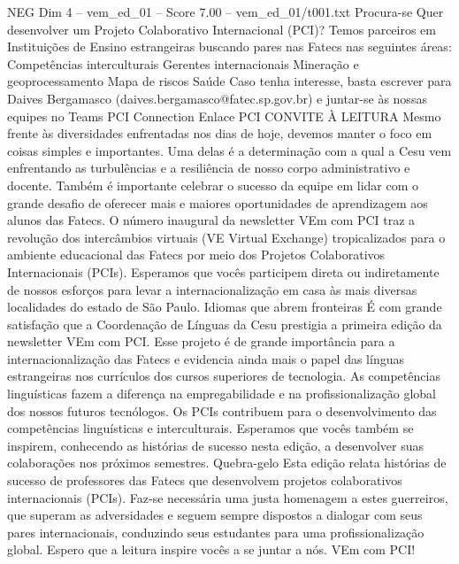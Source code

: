 \begin{textsample}{NEG Dim 4 – vem\_ed\_01 – Score 7.00 – vem\_ed\_01/t001.txt}  \label{ex:f4_neg_155}
Procura-se Quer desenvolver um Projeto Colaborativo Internacional (PCI)?
Temos parceiros em Instituições de Ensino estrangeiras buscando pares nas Fatecs nas seguintes áreas: Competências interculturais Gerentes internacionais Mineração e geoprocessamento Mapa de riscos Saúde Caso tenha interesse, basta escrever para Daives Bergamasco (daives.bergamasco@fatec.sp.gov.br) e juntar-se às nossas equipes no Teams PCI Connection Enlace PCI CONVITE À LEITURA Mesmo frente às diversidades enfrentadas nos dias de hoje, devemos manter o foco em coisas simples e importantes.
Uma delas é a determinação com a qual a Cesu vem enfrentando as turbulências e a resiliência de nosso corpo administrativo e docente.
Também é importante celebrar o sucesso da equipe em lidar com o grande desafio de oferecer mais e maiores oportunidades de aprendizagem aos alunos das Fatecs.
O número inaugural da newsletter VEm com PCI traz a revolução dos intercâmbios virtuais (VE Virtual Exchange) tropicalizados para o ambiente educacional das Fatecs por meio dos Projetos Colaborativos Internacionais (PCIs).
Esperamos que vocês participem direta ou indiretamente de nossos esforços para levar a internacionalização em casa às mais diversas localidades do estado de São Paulo.
Idiomas que abrem fronteiras É com grande satisfação que a Coordenação de Línguas da Cesu prestigia a primeira edição da newsletter VEm com PCI.
Esse projeto é de grande importância para a internacionalização das Fatecs e evidencia ainda mais o papel das línguas estrangeiras nos currículos dos cursos superiores de tecnologia.
As competências linguísticas fazem a diferença na empregabilidade e na profissionalização global dos nossos futuros tecnólogos.
Os PCIs contribuem para o desenvolvimento das competências linguísticas e interculturais.
Esperamos que vocês também se inspirem, conhecendo as histórias de sucesso nesta edição, a desenvolver suas colaborações nos próximos semestres.
Quebra-gelo Esta edição relata histórias de sucesso de professores das Fatecs que desenvolvem projetos colaborativos internacionais (PCIs).
Faz-se necessária uma justa homenagem a estes guerreiros, que superam as adversidades e seguem sempre dispostos a dialogar com seus pares internacionais, conduzindo seus estudantes para uma profissionalização global.
Espero que a leitura inspire vocês a se juntar a nós.
VEm com PCI!

\end{textsample}
